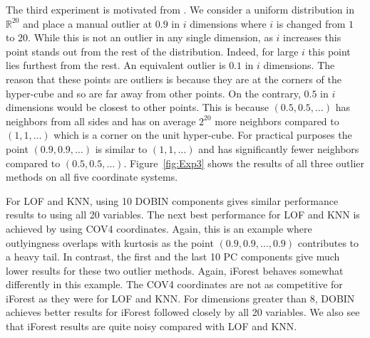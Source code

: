 \documentclass[letter,12pt]{article}
\begin{document}
The third experiment is motivated from \cite{zimek2012survey}. We consider a uniform distribution in $\mathbb{R}^{20}$ and place a manual outlier at $0.9$ in $i$ dimensions where $i$ is changed from $1$ to $20$. While this is not an outlier in any single dimension, as $i$ increases this point stands out from the rest of the distribution. Indeed, for large $i$ this point lies furthest from the rest. An equivalent outlier is $0.1$ in $i$ dimensions. The reason that these points are outliers is because they are at the corners of the hyper-cube and so are far away from other points. On the contrary, $0.5$ in $i$ dimensions would be closest to other points. This is because $(0.5, 0.5, \dots)$ has neighbors from all sides and has on average $2^{20}$ more neighbors compared to $(1, 1, \dots)$ which is a corner on the unit hyper-cube. For practical purposes the point $(0.9, 0.9, \dots)$ is similar to $(1, 1, \dots)$ and has significantly {\color{blue} fewer } neighbors compared to $(0.5, 0.5, \dots)$. Figure~\ref{fig:Exp3} shows the results of all three outlier methods on all {\color{blue} five } coordinate systems. %

{\color{blue} For LOF and KNN, using 10 DOBIN components gives similar performance results to using all 20 variables. The next best performance for LOF and KNN is achieved by using COV4 coordinates. Again, this is an example where outlyingness overlaps with kurtosis as the point $(0.9, 0.9, \ldots, 0.9)$ contributes to a heavy tail. In contrast, the first and the last 10 PC components give much lower results for these two outlier methods. Again, iForest behaves somewhat differently in this example. The COV4 coordinates are not as competitive for iForest as they were for LOF and KNN. For dimensions greater than 8, DOBIN achieves better results for iForest followed closely by all 20 variables.  We also see that iForest results are quite noisy compared with LOF and KNN. }
\end{document}
